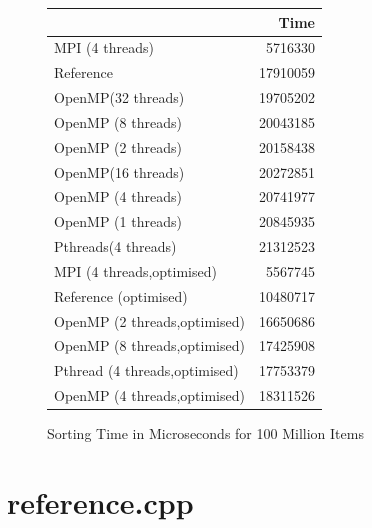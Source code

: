 \documentclass[12pt]{article}
\begin{document}
\begin{figure} [ht]
	\centering
	\begin{tabular}{|l|r|}
		\hline
		& Time  \\ \hline
		MPI (4 threads)&5716330      \\ \hline
		Reference&17910059           \\ \hline
		OpenMP(32 threads)&19705202 \\ \hline
		OpenMP (8 threads)&20043185 \\ \hline
		OpenMP (2 threads)&20158438 \\ \hline
		OpenMP(16 threads)&20272851 \\ \hline
		OpenMP (4 threads)&20741977 \\ \hline
		OpenMP (1 threads)&20845935 \\ \hline
		Pthreads(4 threads)&21312523 \\ \hline
		\hline
		MPI (4 threads,optimised)&5567745 \\ \hline
		Reference (optimised)&10480717\\ \hline
		OpenMP (2 threads,optimised)&16650686 \\ \hline
		OpenMP (8 threads,optimised)&17425908 \\ \hline
		Pthread (4 threads,optimised)&17753379 \\ \hline
		OpenMP (4 threads,optimised)&18311526 \\ \hline
	\end{tabular}
	\caption{Sorting Time in Microseconds for 100 Million Items}
	\label{sorting_time3}
\end{figure}

\newpage
\clearpage
\appendix
\section{reference.cpp}
\end{document}
